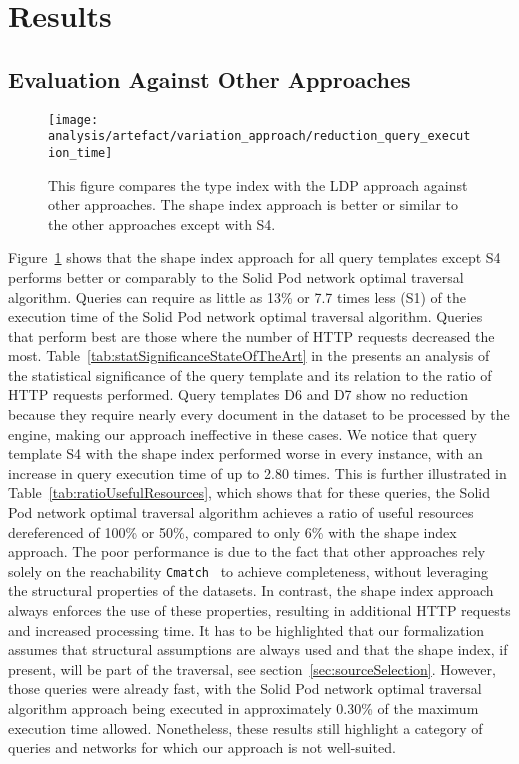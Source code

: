 \section{Results}

\subsection{Evaluation Against Other Approaches}

\begin{figure}[h]
    \centering
    \texttt{[image: analysis/artefact/variation\_approach/reduction\_query\_execution\_time]}
    \caption{
        This figure compares the type index with the LDP approach against other approaches.
        The shape index approach is better or similar to the other approaches except with S4.
    }
    \label{fig:compApproach}
\end{figure}


Figure~\ref{fig:compApproach} shows that the shape index approach for all query templates except S4 performs better or comparably to the Solid Pod network optimal traversal algorithm.
Queries can require as little as 13\% or 7.7 times less (S1) of the execution time of the Solid Pod network optimal traversal algorithm.
Queries that perform best are those where the number of HTTP requests decreased the most.
Table~\ref{tab:statSignificanceStateOfTheArt} in the  presents an analysis of the statistical significance of the query template and its relation to the ratio of HTTP requests performed.
Query templates D6 and D7 show no reduction because they require nearly every document in the dataset to be processed by the engine, making our approach ineffective in these cases.
We notice that query template S4 with the shape index performed worse in every instance, with an increase in query execution time of up to 2.80 times.
This is further illustrated in Table~\ref{tab:ratioUsefulResources}, which shows that for these queries, the Solid Pod network optimal traversal algorithm achieves a ratio of useful resources dereferenced of 100\% or 50\%, compared to only 6\% with the shape index approach.
The poor performance is due to the fact that other approaches rely solely on the reachability \texttt{Cmatch}~\cite{hartig2016walking} to achieve completeness, without leveraging the structural properties of the datasets.
In contrast, the shape index approach always enforces the use of these properties, resulting in additional HTTP requests and increased processing time.
It has to be highlighted that our formalization assumes that structural assumptions are always used and that the shape index, if present, will be part of the traversal, see section~\ref{sec:sourceSelection}.
However, those queries were already fast, with the Solid Pod network optimal traversal algorithm approach being executed in approximately 0.30\% of the maximum execution time allowed.
Nonetheless, these results still highlight a category of queries and networks for which our approach is not well-suited.

